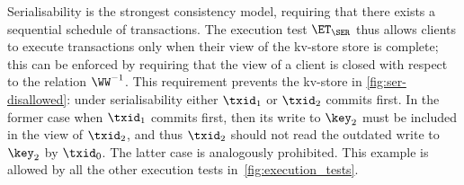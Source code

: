 Serialisability is the strongest consistency model, requiring that there exists a sequential schedule of transactions. 
The execution test $\ET_{\SER}$ thus allows clients to execute transactions only when 
their view of the kv-store store is complete; this can be enforced by requiring that the view 
of a client is closed with respect to the relation $\WW^{-1}$.
This requirement prevents the kv-store in  \cref{fig:ser-disallowed}: under serialisability either $\txid_1$ or $\txid_2$ commits first.
In the former case when $\txid_1$ commits first, then its write to $\key_2$ must be included in the view of $\txid_2$, and thus $\txid_2$ should not read the outdated write to $\key_2$ by $\txid_0$. 
The latter case is analogously prohibited. 
This example is allowed by all the other execution tests in~\cref{fig:execution_tests}.


